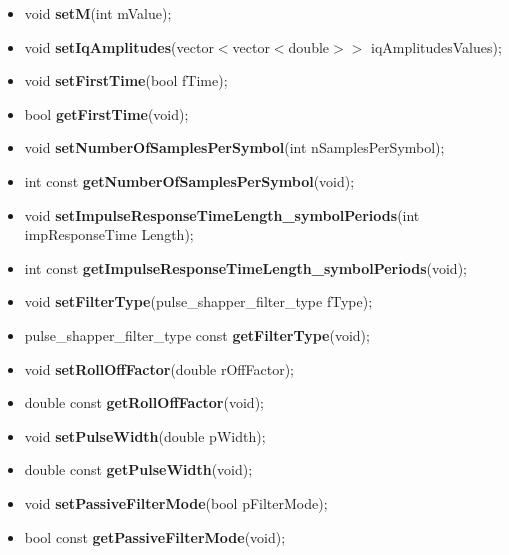 \begin{itemize}
     \item void \textbf{setM}(int mValue);
     \item void \textbf{setIqAmplitudes}(vector$<$vector$<$double$>>$ iqAmplitudesValues);
     \item void \textbf{setFirstTime}(bool fTime);
     \item bool \textbf{getFirstTime}(void);
     \item void \textbf{setNumberOfSamplesPerSymbol}(int nSamplesPerSymbol);
     \item int const \textbf{getNumberOfSamplesPerSymbol}(void);
     \item void \textbf{setImpulseResponseTimeLength\_symbolPeriods}(int impResponseTime Length);
     \item int const \textbf{getImpulseResponseTimeLength\_symbolPeriods}(void);
     \item void \textbf{setFilterType}(pulse\_shapper\_filter\_type fType);
     \item pulse\_shapper\_filter\_type const \textbf{getFilterType}(void);
     \item void \textbf{setRollOffFactor}(double rOffFactor);
     \item double const \textbf{getRollOffFactor}(void);
     \item void \textbf{setPulseWidth}(double pWidth);
     \item double const \textbf{getPulseWidth}(void);
     \item void \textbf{setPassiveFilterMode}(bool pFilterMode);
     \item bool const \textbf{getPassiveFilterMode}(void);
\end{itemize}



